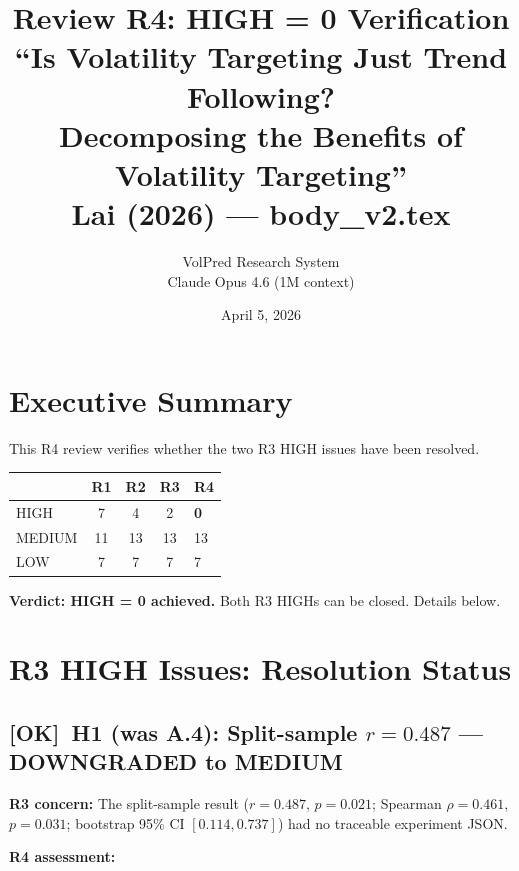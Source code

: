 \documentclass[12pt,a4paper]{article}
\title{Review R4: HIGH = 0 Verification\\[6pt]
\Large ``Is Volatility Targeting Just Trend Following?\\
Decomposing the Benefits of Volatility Targeting''\\[6pt]
\normalsize Lai (2026) --- body\_v2.tex}
\author{VolPred Research System\\
\small Claude Opus 4.6 (1M context)}
\date{April 5, 2026}
\newcommand{\OK}{\textcolor{okgreen}{\textbf{[OK]}}}
\begin{document}
\maketitle

\section{Executive Summary}

This R4 review verifies whether the two R3 HIGH issues have been resolved.

\begin{center}
\begin{tabular}{lcccl}
\toprule
& R1 & R2 & R3 & \textbf{R4} \\
\midrule
HIGH    & 7 & 4 & 2 & \textbf{0} \\
MEDIUM  & 11 & 13 & 13 & 13 \\
LOW     & 7 & 7 & 7 & 7 \\
\bottomrule
\end{tabular}
\end{center}

\noindent\textbf{Verdict: HIGH = 0 achieved.} Both R3 HIGHs can be closed. Details below.


\section{R3 HIGH Issues: Resolution Status}

\subsection{\OK\ H1 (was A.4): Split-sample $r = 0.487$ --- DOWNGRADED to MEDIUM}

\textbf{R3 concern:} The split-sample result ($r = 0.487$, $p = 0.021$; Spearman $\rho = 0.461$, $p = 0.031$; bootstrap 95\% CI $[0.114, 0.737]$) had no traceable experiment JSON.

\medskip
\noindent\textbf{R4 assessment:}
\end{document}
